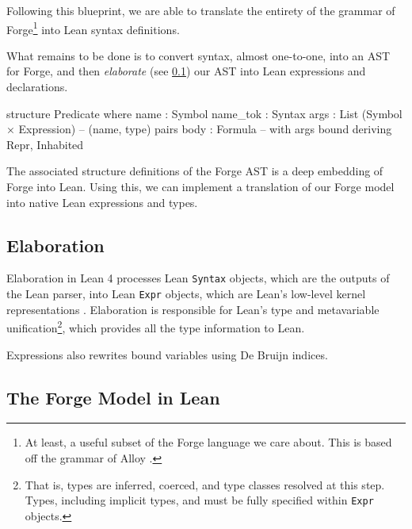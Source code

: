 Following this blueprint, we are able to translate the entirety of the grammar of Forge\footnote{At least, a useful subset of the Forge language we care about. This is based off the grammar of Alloy \cite{jackson2012software,jackson2019alloy,ngpdbccdlrrvwwk-oopsla-2024}.} into Lean syntax definitions. 

What remains to be done is to convert syntax, almost one-to-one, into an AST for Forge, and then \emph{elaborate} (see \cref{sec:elaboration}) our AST into Lean expressions and declarations.

\begin{leanimpl}
structure Predicate where
  name : Symbol
  name_tok : Syntax
  args : List (Symbol × Expression) -- (name, type) pairs
  body : Formula -- with args bound
  deriving Repr, Inhabited   
\end{leanimpl}

The associated structure definitions of the Forge AST is a deep embedding of Forge into Lean. Using this, we can implement a translation of our Forge model into native Lean expressions and types. 

\subsection{Elaboration}\label{sec:elaboration}

Elaboration in Lean 4 processes Lean \texttt{Syntax} objects, which are the outputs of the Lean parser, into Lean \texttt{Expr} objects, which are Lean's low-level kernel representations \cite{metaprogramming}. Elaboration is responsible for Lean's type and metavariable unification\footnote{That is, types are inferred, coerced, and type classes resolved at this step. Types, including implicit types, and must be fully specified within \texttt{Expr} objects.}, which provides all the type information to Lean. 

Expressions  also rewrites bound variables using De Bruijn indices. 

\subsection{The Forge Model in Lean}\label{sec:forge-model}

